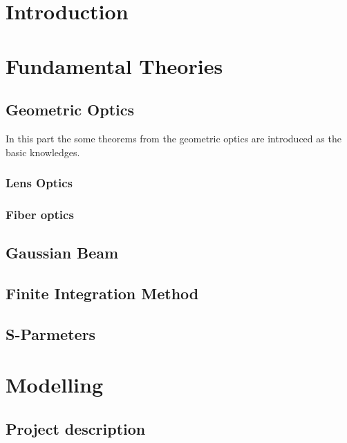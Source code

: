 
\chapter{Introduction}



\chapter{Fundamental Theories}
\label{chp:background}

\section{Geometric Optics}
\label{sect:background_optics}
In this part the  some theorems from the geometric optics  are introduced as the basic knowledges.
\subsection{Lens Optics}

\subsection{Fiber optics}


\section{Gaussian Beam}
%

\section{Finite Integration Method}
%
%

\section{S-Parmeters}
%

\chapter{Modelling}
\label{chp:model}

\section{Project description}

